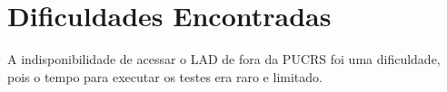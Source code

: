 \section{Dificuldades Encontradas}

A indisponibilidade de acessar o LAD de fora da PUCRS foi uma dificuldade, pois o tempo para executar os testes era raro e limitado.